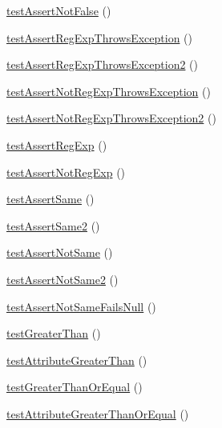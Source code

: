 \begin{DoxyCompactItemize}
\item 
\mbox{\hyperlink{class_framework___assert_test_aac6142ed097aabda955ec19cb005d42d}{test\+Assert\+Not\+False}} ()
\item 
\mbox{\hyperlink{class_framework___assert_test_a7c2a79cb64324dbae112e9963160a189}{test\+Assert\+Reg\+Exp\+Throws\+Exception}} ()
\item 
\mbox{\hyperlink{class_framework___assert_test_aacc2d8af316675084ef71026cbeb807d}{test\+Assert\+Reg\+Exp\+Throws\+Exception2}} ()
\item 
\mbox{\hyperlink{class_framework___assert_test_aa75f0851df6f1c9234e89728f9fc05c4}{test\+Assert\+Not\+Reg\+Exp\+Throws\+Exception}} ()
\item 
\mbox{\hyperlink{class_framework___assert_test_abd89ee6e19ea3cc6dc5b572c0059680a}{test\+Assert\+Not\+Reg\+Exp\+Throws\+Exception2}} ()
\item 
\mbox{\hyperlink{class_framework___assert_test_a607964975983bc7cecf54ff4a911f922}{test\+Assert\+Reg\+Exp}} ()
\item 
\mbox{\hyperlink{class_framework___assert_test_ae88c75b579171f83d982a1f65d970fcd}{test\+Assert\+Not\+Reg\+Exp}} ()
\item 
\mbox{\hyperlink{class_framework___assert_test_ac02f213ae4be35b1d06059cd9c2590b0}{test\+Assert\+Same}} ()
\item 
\mbox{\hyperlink{class_framework___assert_test_af69c50737e0403863ca9b698a34e1d72}{test\+Assert\+Same2}} ()
\item 
\mbox{\hyperlink{class_framework___assert_test_ae2c892d2f7d2b56556bb0a6b0c06f5a7}{test\+Assert\+Not\+Same}} ()
\item 
\mbox{\hyperlink{class_framework___assert_test_a90a2517f65c713f558057660fc420e3d}{test\+Assert\+Not\+Same2}} ()
\item 
\mbox{\hyperlink{class_framework___assert_test_a46f37a4917e3c2a9da66161a444f931f}{test\+Assert\+Not\+Same\+Fails\+Null}} ()
\item 
\mbox{\hyperlink{class_framework___assert_test_a2ce09987dae88061fe5cd71256be5ba1}{test\+Greater\+Than}} ()
\item 
\mbox{\hyperlink{class_framework___assert_test_affe6b19d5f20977d48285e42a04c110a}{test\+Attribute\+Greater\+Than}} ()
\item 
\mbox{\hyperlink{class_framework___assert_test_a7729f2fb434673d441936e45b0a38aa4}{test\+Greater\+Than\+Or\+Equal}} ()
\item 
\mbox{\hyperlink{class_framework___assert_test_ae6c32ce8658e104d878645fdb736ed4a}{test\+Attribute\+Greater\+Than\+Or\+Equal}} ()

\end{DoxyCompactItemize}

